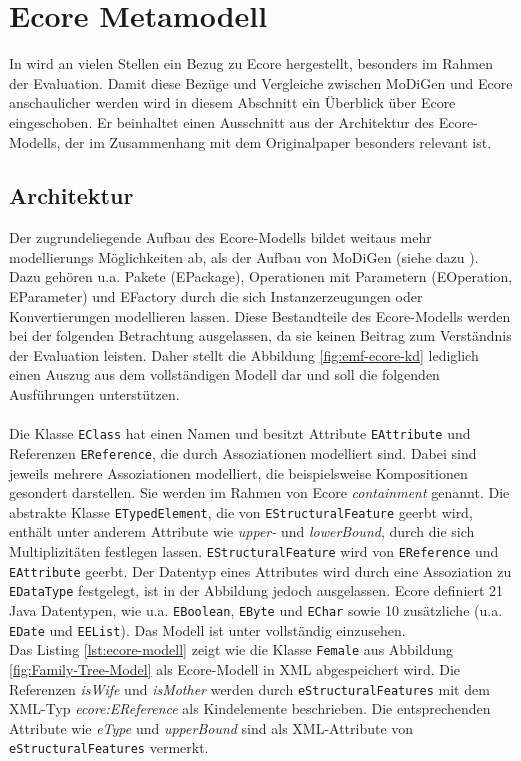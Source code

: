\section{Ecore Metamodell}
In \cite{gerhart2015approach} wird an vielen Stellen ein Bezug zu Ecore hergestellt, besonders im Rahmen der Evaluation. Damit diese Bezüge und Vergleiche zwischen MoDiGen und Ecore anschaulicher werden wird in diesem Abschnitt ein Überblick über Ecore eingeschoben. Er beinhaltet einen Ausschnitt aus der Architektur des Ecore-Modells, der im Zusammenhang mit dem Originalpaper besonders relevant ist.

\subsection{Architektur}
Der zugrundeliegende Aufbau des Ecore-Modells bildet weitaus mehr modellierungs Möglichkeiten ab, als der Aufbau von MoDiGen (siehe dazu \cite{eclipse_ecore}). Dazu gehören u.a. Pakete (EPackage), Operationen mit Parametern (EOperation, EParameter) und EFactory durch die sich Instanzerzeugungen oder Konvertierungen modellieren lassen. Diese Bestandteile des Ecore-Modells werden bei der folgenden Betrachtung ausgelassen, da sie keinen Beitrag zum Verständnis der Evaluation  leisten. Daher stellt die Abbildung \ref{fig:emf-ecore-kd} lediglich einen Auszug aus dem vollständigen Modell dar und soll die folgenden Ausführungen unterstützen.\\
\\
Die Klasse \texttt{EClass} hat einen Namen und besitzt Attribute \texttt{EAttribute} und Referenzen \texttt{EReference}, die durch Assoziationen modelliert sind. Dabei sind jeweils mehrere Assoziationen modelliert, die beispielsweise Kompositionen gesondert darstellen. Sie werden im Rahmen von Ecore \textit{containment} genannt. 
Die abstrakte Klasse \texttt{ETypedElement}, die von \texttt{EStructuralFeature} geerbt wird, enth\"alt unter anderem Attribute wie \textit{upper-} und \textit{lowerBound}, durch die sich Multiplizitäten festlegen lassen. \texttt{EStructuralFeature} wird von \texttt{EReference} und \texttt{EAttribute} geerbt. Der Datentyp eines Attributes wird durch eine Assoziation zu \texttt{EDataType} festgelegt, ist in der Abbildung jedoch ausgelassen. Ecore definiert 21 Java Datentypen, wie u.a. \texttt{EBoolean}, \texttt{EByte} und \texttt{EChar} sowie 10 zus\"atzliche (u.a. \texttt{EDate} und \texttt{EEList}). Das Modell ist unter \cite{eclipse_ecore} vollst\"andig einzusehen.\\



Das Listing \ref{lst:ecore-modell} zeigt wie die Klasse \texttt{Female} aus Abbildung \ref{fig:Family-Tree-Model} als Ecore-Modell in XML abgespeichert wird. Die Referenzen \textit{isWife} und \textit{isMother} werden durch \texttt{eStructuralFeatures} mit dem XML-Typ \textit{ecore:EReference} als Kindelemente beschrieben. Die entsprechenden Attribute wie \textit{eType} und \textit{upperBound} sind als XML-Attribute von \texttt{eStructuralFeatures} vermerkt.



